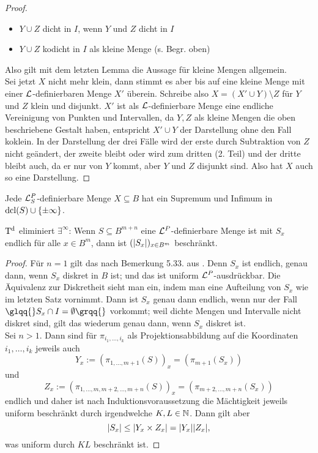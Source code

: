 \begin{proof}
\begin{itemize}
		\item $Y\cup Z$ dicht in $I$, wenn $Y$ und $Z$ dicht in $I$
		\item $Y\cup Z$ kodicht in $I$ als kleine Menge (s. Begr. oben)
	\end{itemize}
    Also gilt mit dem letzten Lemma die Aussage für kleine Mengen allgemein.\\
	Sei jetzt $X$ nicht mehr klein, dann stimmt es aber bis auf eine kleine Menge mit einer $\mathcal{L}$-definierbaren Menge $X'$ überein. Schreibe also $X=(X'\cup Y)\setminus Z$ für $Y$ und $Z$ klein und disjunkt. $X'$ ist als $\mathcal{L}$-definierbare Menge eine endliche Vereinigung von Punkten und Intervallen, da $Y,Z$  als kleine Mengen die oben beschriebene Gestalt haben, entspricht $X'\cup Y$ der Darstellung ohne den Fall koklein. In der Darstellung der drei Fälle wird der erste durch Subtraktion von $Z$ nicht geändert, der zweite bleibt oder wird zum dritten (2. Teil) und der dritte bleibt auch, da er nur von $Y$ kommt, aber $Y$ und $Z$ disjunkt sind. Also hat $X$ auch so eine Darstellung.
\end{proof}

\begin{corollary}
	Jede $\mathcal{L}^P_S$-definierbare Menge $X\subseteq B$ hat ein Supremum und Infimum in $\operatorname{dcl}(S)\cup\{\pm\infty\}$.
\end{corollary}

\begin{lemma}
	$\operatorname{T^d}$ eliminiert $\exists^\infty$: Wenn $S\subseteq B^{m+n}$ eine $\mathcal{L}^P$-definierbare Menge ist mit $S_x$ endlich für alle $x\in B^m$, dann ist $({\left| S_x \right|})_{x\in B^m}$ beschränkt.
\end{lemma}
\begin{proof}
	Für $n=1$ gilt das nach Bemerkung 5.33. aus \cite{Lukas}. Denn $S_x$ ist endlich, genau dann, wenn $S_x$ diskret in $B$ ist; und das ist uniform $\mathcal{L}^P$-ausdrückbar. Die Äquivalenz zur Diskretheit sieht man ein, indem man eine Aufteilung von $S_x$ wie im letzten Satz vornimmt. Dann ist $S_x$ genau dann endlich, wenn nur der Fall $\glqq{}S_x\cap I=\emptyset\grqq{}$ vorkommt; weil dichte Mengen und Intervalle nicht diskret sind, gilt das wiederum genau dann, wenn $S_x$ diskret ist.\\
	Sei $n>1$. Dann sind für $\pi_{i_1,\dots,i_k}$ als Projektionsabbildung auf die Koordinaten $i_1,\dots,i_k$ jeweils auch $$Y_x:=(\pi_{1,\dots,m+1}(S))_x=(\pi_{m+1}(S_x))$$ und $$Z_x:=(\pi_{1,\dots,m,m+2,\dots,m+n}(S))_x=(\pi_{m+2,\dots,m+n}(S_x))$$ endlich und daher ist nach Induktionsvoraussetzung die Mächtigkeit jeweils uniform beschränkt durch irgendwelche $K,L\in\mathbb{N}$. Dann gilt aber $${\left| S_x \right|}\leq {\left| Y_x\times Z_x \right|}={\left| Y_x \right|}{\left| Z_x \right|},$$ was uniform durch $KL$ beschränkt ist.
\end{proof}

